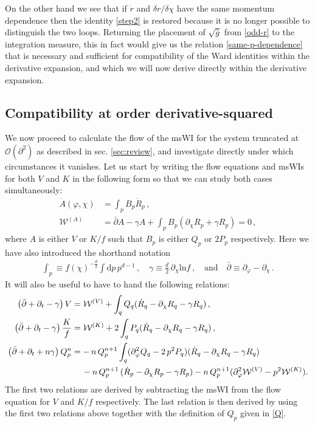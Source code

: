 \documentclass[11pt]{book} %
\numberwithin{equation}{chapter}
\begin{document}
On the other hand we see that if $\dot{r}$ and $\delta r/\delta\chi$ have the same momentum
dependence then the identity \eqref{step2} is restored because it is no longer possible
to distinguish the two loops.
Returning the placement of $\sqrt{\bar{g}}$ from \eqref{odd-r} to the integration measure,
this in fact would give us the relation \eqref{same-p-dependence} that is necessary and
sufficient for compatibility of the Ward identities within the derivative expansion,
and which we will now derive directly within the derivative expansion.


\subsection{Compatibility at order derivative-squared}\label{sec:compatibility-at-d2}

We now proceed to calculate the flow of the msWI for the system truncated
at $\mathcal{O}(\partial^2)$ as described in sec. \ref{sec:review},
and investigate directly under which circumstances it vanishes.
Let us start by writing the flow equations and msWIs for both $V$ and $K$ in the following form
so that we can study both cases simultaneously:
\begin{align}
	\label{flowA}
	\dot A(\varphi,\chi) &= \int_p B_p\dot R_p \,,\\
	\label{msWIA}
	\mathcal{W}^{(A)}&=\bar\partial A - \gamma A + \int_p B_p(\partial_\chi R_p + \gamma R_p)=0 \,,
\end{align}
where $A$ is either $V$ or $K/f$ such that $B_p$ is either $Q_p$ or $2 P_p$ respectively.
Here we have also introduced the shorthand notation
\begin{align}
  \label{gamma}
  \int_p \equiv f(\chi)^{-\frac{d}{2}} \int \mathrm dp \,p^{d-1} \,,
  \quad \gamma \equiv \frac{d}{2} \, \partial_\chi \mathrm{ln} f \,,
  \quad \text{and} \quad \bar\partial \equiv \partial_\varphi - \partial_\chi\,.
\end{align}
It will also be useful to have to hand the following relations:
\begin{align}
	\label{DV}
	\left( \bar \partial + \partial_t - \gamma \right) V &=
	\mathcal W^{(V)} + \int_q Q_q (\dot R_q - \partial_{\chi} R_q - \gamma R_q)\,,\\
	\label{DK}
	\left( \bar \partial + \partial_t - \gamma \right) \frac{K}{f} &=
	\mathcal W^{(K)} + 2 \int_q P_q (\dot R_q - \partial_{\chi} R_q - \gamma R_q)\,,\\
	\label{DQ}
	\left( \bar \partial + \partial_t + n \gamma \right) Q_p^n &=
	- \, n \, Q_p^{n+1} \int_q (\partial_{\varphi}^2 Q_q - 2 \, p^2 P_q)(\dot R_q - \partial_{\chi} R_q
	 - \gamma R_q)\nonumber\\
   &\hspace{4.2mm}-n \, Q_p^{n+1} \, (\dot R_p - \partial_{\chi} R_p - \gamma R_p)
	-n \, Q_p^{n+1} (\partial_{\varphi}^2 \mathcal W^{(V)} - p^2 \mathcal W^{(K)}).
\end{align}
The first two relations are derived by subtracting the msWI from the flow equation for
$V$ and $K/f$ respectively. The last relation is then derived by using the first two relations
above together with the definition of $Q_p$ given in \eqref{Q}.
\end{document}
